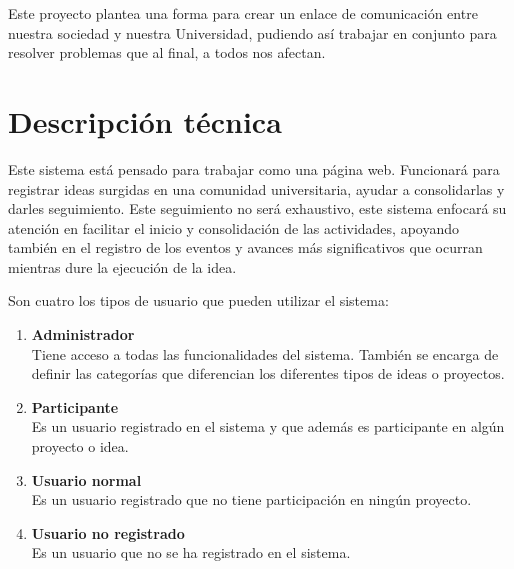 \documentclass[11pt,letterpaper,titlepage]{article}
\begin{document}
Este proyecto plantea una forma para crear un enlace de comunicaci\'on entre nuestra sociedad y nuestra Universidad, pudiendo as\'i trabajar en conjunto para resolver problemas que al final, a todos nos afectan.


% 
% 
% 
% 
% 
\section{Descripci\'on t\'ecnica}

Este sistema est\'a pensado para trabajar como una p\'agina web. Funcionar\'a para registrar ideas surgidas en una comunidad universitaria, ayudar a consolidarlas y darles seguimiento. Este seguimiento no ser\'a exhaustivo, este sistema enfocar\'a su atenci\'on  en facilitar el inicio  y consolidaci\'on de las actividades, apoyando tambi\'en en el registro de los eventos y avances m\'as significativos que ocurran mientras dure la ejecuci\'on de la idea.

Son cuatro los tipos de usuario que pueden utilizar el sistema:
\begin{enumerate}
 \item \textbf{Administrador}\\Tiene acceso a todas las funcionalidades del sistema. Tambi\'en se encarga de definir las categor\'ias que diferencian los diferentes tipos de ideas o proyectos.
 \item \textbf{Participante}\\Es un usuario registrado en el sistema y que adem\'as  es participante en alg\'un proyecto o idea.
 \item \textbf{Usuario normal}\\Es un usuario registrado que no tiene participaci\'on en ning\'un proyecto.
 \item \textbf{Usuario no registrado}\\Es un usuario que no se ha registrado en el sistema.
\end{enumerate}
\end{document}
